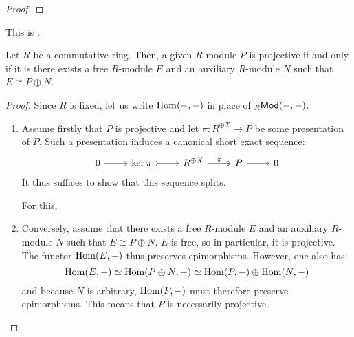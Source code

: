                 \begin{lemma} \label{lemma: epimorphisms_into_projectives_split}
                
                \end{lemma}
                    \begin{proof}
                        
                    \end{proof}
                \begin{proposition} \label{prop: projective_modules_are_direct_summands_of_free_modules}
                    This is \cite[Proposition VIII.6.4]{chapter0}.
                        
                    Let $R$ be a commutative ring. Then, a given $R$-module $P$ is projective if and only if it is there exists a free $R$-module $E$ and an auxiliary $R$-module $N$ such that $E \cong P \oplus N$.
                \end{proposition}
                    \begin{proof}
                        Since $R$ is fixed, let us write $\mathrm{Hom}(-, -)$ in place of ${}_R\mathsf{Mod}(-, -)$. 
                        \begin{enumerate}
                            \item Assume firstly that $P$ is projective and let $\pi: R^{\oplus X} \to P$ be some presentation of $P$. Such a presentation induces a canonical short exact sequence:
                                $$
                                    \begin{tikzcd}
                                    	0 & {\ker \pi} & {R^{\oplus X}} & P & 0
                                    	\arrow[from=1-1, to=1-2]
                                    	\arrow[tail, from=1-2, to=1-3]
                                    	\arrow["\pi", two heads, from=1-3, to=1-4]
                                    	\arrow[from=1-4, to=1-5]
                                    \end{tikzcd}
                                $$
                            It thus suffices to show that this sequence splits. 
                            
                            For this, 
                            \item Conversely, assume that there exists a free $R$-module $E$ and an auxiliary $R$-module $N$ such that $E \cong P \oplus N$. $E$ is free, so in particular, it is projective. The functor $\mathrm{Hom}(E, -)$ thus preserves epimorphisms. However, one also has:
                                $$\mathrm{Hom}(E, -) \simeq \mathrm{Hom}(P \oplus N, -) \simeq \mathrm{Hom}(P, -) \oplus \mathrm{Hom}(N, -)$$
                            and because $N$ is arbitrary, $\mathrm{Hom}(P, -)$ must therefore preserve epimorphisms. This means that $P$ is necessarily projective. 
                        \end{enumerate}
                    \end{proof}
